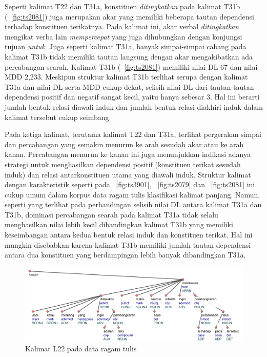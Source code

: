 Seperti kalimat T22 dan T31a, konstituen \textit{ditingkatkan} pada kalimat T31b (\pic~\ref{fig:ts2081}) juga merupakan akar yang memiliki beberapa tautan dependensi terhadap konstituen terikatnya. Pada kalimat ini, akar verbal \textit{ditingkatkan} mengikat verba lain \textit{mempercepat} yang juga dihubungkan dengan konjungsi tujuan \textit{untuk}. Juga seperti kalimat T31a, banyak simpai-simpai cabang pada kalimat T31b tidak memiliki tautan langsung dengan akar mengakibatkan ada percabangan searah. Kalimat T31b (\pic~\ref{fig:ts2081}) memiliki nilai DL 67 dan nilai MDD 2,233. Meskipun struktur kalimat T31b terlihat serupa dengan kalimat T31a dan nilai DL serta MDD cukup dekat, selisih nilai DL dari tautan-tautan dependensi positif dan negatif sangat kecil, yaitu hanya sebesar 3. Hal ini berarti jumlah bentuk relasi diawali induk dan jumlah bentuk relasi diakhiri induk dalam kalimat tersebut cukup seimbang. 

Pada ketiga kalimat, terutama kalimat T22 dan T31a, terlihat pergerakan simpai dan percabangan yang semakin menurun ke arah sesudah akar atau ke arah kanan. Percabangan menurun ke kanan ini juga menunjukkan indikasi adanya strategi untuk menghasilkan dependensi positif (konstituen terikat sesudah induk) dan relasi antarkonstituen utama yang diawali induk. Struktur kalimat dengan karakteristik seperti pada \pic~\ref{fig:ts3901}, \pic~\ref{fig:ts2079} dan \pic~\ref{fig:ts2081} ini cukup umum dalam korpus data ragam tulis klasifikasi kalimat panjang. Namun, seperti yang terlihat pada perbandingan selisih nilai DL antara kalimat T31a dan T31b, dominasi percabangan searah pada kalimat T31a tidak selalu menghasilkan nilai lebih kecil dibandingkan kalimat T31b yang memiliki keseimbangan antara kedua bentuk relasi induk dan konstituen terikat. Hal ini mungkin disebabkan karena kalimat T31b memiliki jumlah tautan dependensi antara dua konstituen yang berdampingan lebih banyak dibandingkan T31a.

\begin{figure}
	\centering \includegraphics[width=1
	\textwidth] {pics/ls6521.jpg} 
	\caption{Kalimat L22 pada data ragam tulis} 
	\label{fig:ls6521} 
\end{figure}

